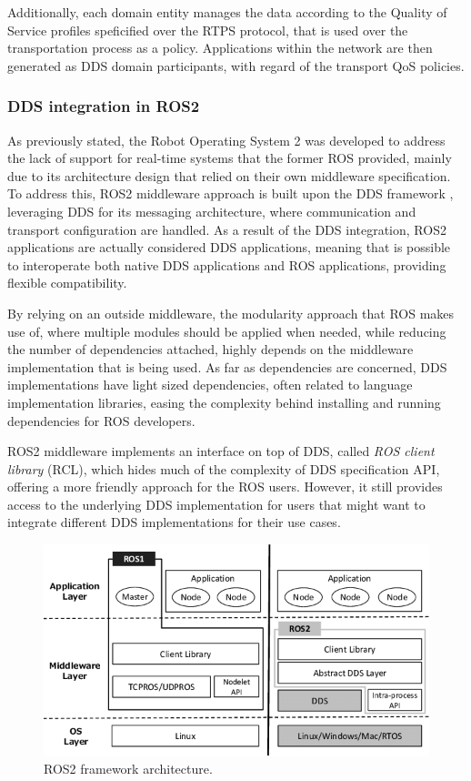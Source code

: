 Additionally, each domain entity manages the data according to the Quality of Service profiles speficified over the RTPS protocol, that is used over the transportation process as a policy. Applications within the network are then generated as DDS domain participants, with regard of the transport QoS policies. 


\subsubsection{DDS integration in ROS2}

As previously stated, the Robot Operating System 2 was developed to address the lack of support for real-time systems that the former ROS provided, mainly due to its architecture design that relied on their own middleware specification. To address this, ROS2 middleware approach is built upon the DDS framework \cite{maruyama2016exploring}, leveraging DDS for its messaging architecture, where communication and transport configuration are handled. As a result of the DDS integration, ROS2 applications are actually considered DDS applications, meaning that is possible to interoperate both native DDS applications and ROS applications, providing flexible compatibility.

By relying on an outside middleware, the modularity approach that ROS makes use of, where multiple modules should be applied when needed, while reducing the number of dependencies attached, highly depends on the middleware implementation that is being used. As far as dependencies are concerned, DDS implementations have light sized dependencies, often related to language implementation libraries, easing the complexity behind installing and running dependencies for ROS developers. \cite{ros-on-dds}

ROS2 middleware implements an interface on top of DDS, called \textit{ROS client library} (RCL), which hides much of the complexity of DDS specification API, offering a more friendly approach for the ROS users. However, it still provides access to the underlying DDS implementation for users that might want to integrate different DDS implementations for their use cases.

\begin{figure}[H]
    \centering
    \includegraphics[width=0.5\linewidth]{images/ROS2-architecture.png}
    \caption{ROS2 framework architecture.}
    \label{fig:dcps-model}
\end{figure}

